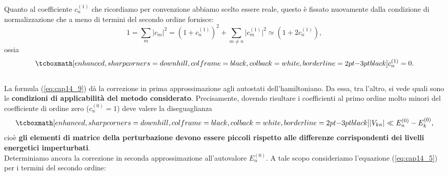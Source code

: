 Quanto al coefficiente $c_n ^{(1)}$ che ricordiamo per convenzione abbiamo scelto essere reale, questo è fissato nuovamente dalla condizione di normalizzazione che a meno di termini del secondo ordine fornisce:
	\begin{equation}
		1= \sum _m \vert c_m \vert ^2 = \left( 1+ c_n ^{(1)}\right) ^2+ \sum _{m\neq n } \vert c_m ^{(1)} \vert ^2 \simeq \left( 1+ 2c_n ^{(1)}\right),
	\end{equation}
ossia
	\begin{equation}
		\tcboxmath[enhanced, sharp corners=downhill, colframe=black, colback=white, borderline={2pt}{-3pt}{black}]{
			c_n ^{(1)} =0.
			}
	\label{eq:cap14_10}
	\end{equation}\\
	
La formula (\ref{eq:cap14_9}) dà la correzione in prima approssimazione agli autostati dell'hamiltoniano. Da essa, tra l'altro, si vede quali sono le \textbf{condizioni di applicabilità del metodo considerato}. Precisamente, dovendo risultare i coefficienti al primo ordine molto minori del coefficiente di ordine zero ($c_n ^{(0)} =1$) deve valere la diseguaglianza
	\begin{equation}
		\tcboxmath[enhanced, sharp corners=downhill, colframe=black, colback=white, borderline={2pt}{-3pt}{black}]{
			\vert V_{kn} \vert \ll E_ n ^{(0)}-E_ k ^{(0)},
		}
	\end{equation}
cioè \textbf{gli elementi di matrice della perturbazione devono essere piccoli rispetto alle differenze corrispondenti dei livelli energetici imperturbati}.\\

Determiniamo ancora la correzione in seconda approssimazione all'autovalore $E_n ^{(0)}$. A tale scopo consideriamo l'equazione (\ref{eq:cap14_5}) per i termini del secondo ordine:\\

